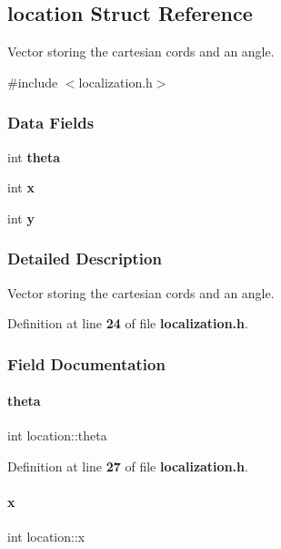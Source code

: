 \subsection{location Struct Reference}
\label{a00179}


Vector storing the cartesian cords and an angle.  




{\ttfamily \#include $<$localization.\+h$>$}

\subsubsection*{Data Fields}
\begin{DoxyCompactItemize}
\item 
int \textbf{ theta}
\item 
int \textbf{ x}
\item 
int \textbf{ y}
\end{DoxyCompactItemize}


\subsubsection{Detailed Description}
Vector storing the cartesian cords and an angle. 

Definition at line \textbf{ 24} of file \textbf{ localization.\+h}.



\subsubsection{Field Documentation}
\mbox{\label{a00179_a4b415222b4dcf34e49dacd22384be9eb}} 
\paragraph{theta}
{\footnotesize\ttfamily int location\+::theta}



Definition at line \textbf{ 27} of file \textbf{ localization.\+h}.

\mbox{\label{a00179_aacd18b2506c49d221cfc37b2119e3c3c}} 
\paragraph{x}
{\footnotesize\ttfamily int location\+::x}



